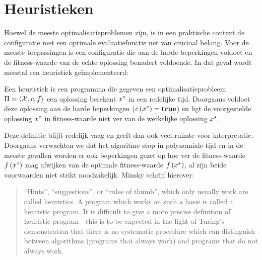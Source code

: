 \section{Heuristieken}

Hoewel de meeste optimalisatieproblemen  zijn, is in een praktische context de configuratie met een optimale evaluatiefunctie net van cruciaal belang. Voor de meeste toepassingen is een configuratie die aan de harde beperkingen voldoet en de fitness-waarde van de echte oplossing benadert voldoende. In dat geval wordt meestal een heuristiek ge\"implementeerd:

\begin{definition}[Heuristiek]
Een heuristiek is een programma die gegeven een optimalisatieprobleem $\Pi=\left\langle \mathcal{X},c,f\right\rangle$ een oplossing berekent $x^{\circ}$ in een redelijke tijd. Doorgaans voldoet deze oplossing aan de harde beperkingen ($c\left(x^{\circ}\right)=\mbox{\textbf{true}}$) en ligt de voorgestelde oplossing $x^{\circ}$ in fitness-waarde niet ver van de werkelijke oplossing $x^{\star}$.
\end{definition}

Deze definitie blijft redelijk vaag en geeft dan ook veel ruimte voor interpretatie. Doorgaans verwachten we dat het algoritme stop in polynomiale tijd en in de meeste gevallen worden er ook beperkingen gezet op hoe ver de fitness-waarde $f\left(x^{\circ}\right)$ mag afwijken van de optimale fitness-waarde $f\left(x^{\star}\right)$, al zijn beide voorwaarden niet strikt noodzakelijk. Minsky\cite{minskyHeuristic} schrijf hierover:
\begin{quote}
``Hints'', ``suggestions'', or ``rules of thumb'', which only usually work are called heuristics. A program which works on such a basis is called a heuristic program. It is difficult to give a more precise definition of heuristic program - this is to be expected in the light of Turing's demonstration that there is no systematic procedure which can distinguish between algorithms (programs that always work) and programs that do not always work.
\end{quote}



